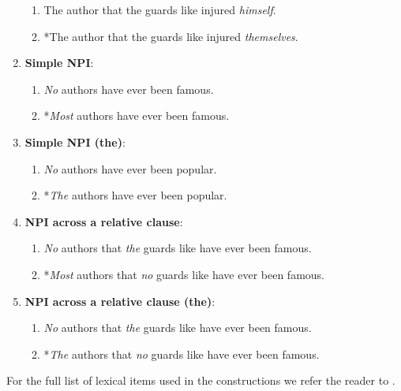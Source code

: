 \begin{enumerate}[noitemsep]
    \begin{enumerate}
      \item The author that the guards like injured \textit{himself}.
      \item *The author that the guards like injured \textit{themselves}.
    \end{enumerate}
  \item \textbf{Simple NPI}:
    \begin{enumerate}
      \item \textit{No} authors have ever been famous.
      \item *\textit{Most} authors have ever been famous.
    \end{enumerate}
  \item \textbf{Simple NPI (the)}:
    \begin{enumerate}
      \item \textit{No} authors have ever been popular.
      \item *\textit{The} authors have ever been popular.
    \end{enumerate}
  \item \textbf{NPI across a relative clause}:
    \begin{enumerate}
      \item \textit{No} authors that \textit{the} guards like have ever been famous.
      \item *\textit{Most} authors that \textit{no} guards like have ever been famous.
    \end{enumerate}
  \item \textbf{NPI across a relative clause (the)}:
    \begin{enumerate}
      \item \textit{No} authors that \textit{the} guards like have ever been famous.
      \item *\textit{The} authors that \textit{no} guards like have ever been famous.
    \end{enumerate}
\end{enumerate}
For the full list of lexical items used in the constructions we refer the reader to \citet{linzen2018targeted}.

